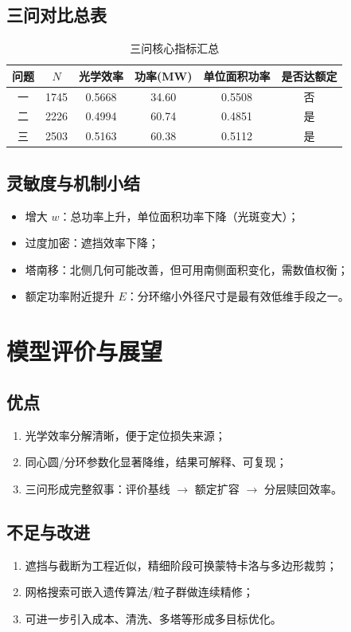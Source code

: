 \documentclass[12pt,a4paper]{ctexart}
\begin{document}
\subsection{三问对比总表}
\begin{table}[htbp]
\centering
\caption{三问核心指标汇总}
\begin{tabular}{cccccc}
\toprule
问题 & $N$ & 光学效率 & 功率(MW) & 单位面积功率 & 是否达额定 \\
\midrule
一 & 1745 & 0.5668 & 34.60 & 0.5508 & 否 \\
二 & 2226 & 0.4994 & 60.74 & 0.4851 & 是 \\
三 & 2503 & 0.5163 & 60.38 & 0.5112 & 是 \\
\bottomrule
\end{tabular}
\end{table}

\subsection{灵敏度与机制小结}
\begin{itemize}
  \item 增大 $w$：总功率上升，单位面积功率下降（光斑变大）；
  \item 过度加密：遮挡效率下降；
  \item 塔南移：北侧几何可能改善，但可用南侧面积变化，需数值权衡；
  \item 额定功率附近提升 $E$：分环缩小外径尺寸是最有效低维手段之一。
\end{itemize}

\section{模型评价与展望}
\subsection{优点}
\begin{enumerate}
  \item 光学效率分解清晰，便于定位损失来源；
  \item 同心圆/分环参数化显著降维，结果可解释、可复现；
  \item 三问形成完整叙事：评价基线 $\rightarrow$ 额定扩容 $\rightarrow$ 分层赎回效率。
\end{enumerate}

\subsection{不足与改进}
\begin{enumerate}
  \item 遮挡与截断为工程近似，精细阶段可换蒙特卡洛与多边形裁剪；
  \item 网格搜索可嵌入遗传算法/粒子群做连续精修；
  \item 可进一步引入成本、清洗、多塔等形成多目标优化。
\end{enumerate}
\end{document}

